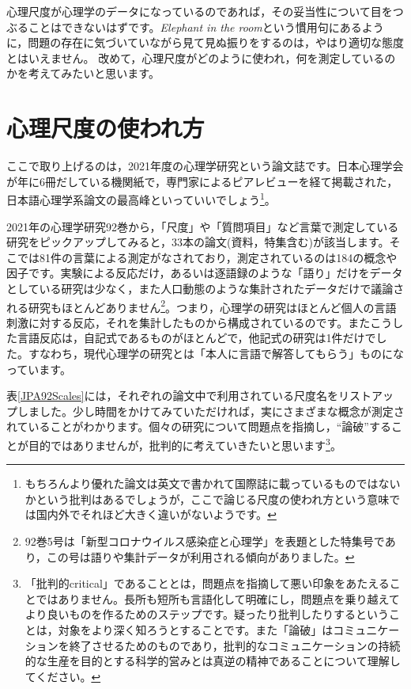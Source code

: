 \documentclass{ltjsbook}
\begin{document}
心理尺度が心理学のデータになっているのであれば，その妥当性について目をつぶることはできないはずです。\textit{Elephant in the room}という慣用句にあるように，問題の存在に気づいていながら見て見ぬ振りをするのは，やはり適切な態度とはいえません。
改めて，心理尺度がどのように使われ，何を測定しているのかを考えてみたいと思います。

\section{心理尺度の使われ方}
ここで取り上げるのは，2021年度の心理学研究という論文誌です。日本心理学会が年に6冊だしている機関紙で，専門家によるピアレビューを経て掲載された，日本語心理学系論文の最高峰といっていいでしょう\footnote{もちろんより優れた論文は英文で書かれて国際誌に載っているものではないかという批判はあるでしょうが，ここで論じる尺度の使われ方という意味では国内外でそれほど大きく違いがないようです。}。

2021年の心理学研究92巻から，「尺度」や「質問項目」など言葉で測定している研究をピックアップしてみると，33本の論文(資料，特集含む)が該当します。そこでは81件の言葉による測定がなされており，測定されているのは184の概念や因子です。実験による反応だけ，あるいは逐語録のような「語り」だけをデータとしている研究は少なく，また人口動態のような集計されたデータだけで議論される研究もほとんどありません\footnote{92巻5号は「新型コロナウイルス感染症と心理学」を表題とした特集号であり，この号は語りや集計データが利用される傾向がありました。}。つまり，心理学の研究はほとんど個人の言語刺激に対する反応，それを集計したものから構成されているのです。またこうした言語反応は，自記式であるものがほとんどで，他記式の研究は1件\citet{Nagatani202292}だけでした。すなわち，現代心理学の研究とは「本人に言語で解答してもらう」ものになっています。

表\ref{JPA92Scales}には，それぞれの論文中で利用されている尺度名をリストアップしました。少し時間をかけてみていただければ，実にさまざまな概念が測定されていることがわかります。個々の研究について問題点を指摘し，``論破''することが目的ではありませんが，批判的に考えていきたいと思います\footnote{「批判的critical」であることとは，問題点を指摘して悪い印象をあたえることではありません。長所も短所も言語化して明確にし，問題点を乗り越えてより良いものを作るためのステップです。疑ったり批判したりするということは，対象をより深く知ろうとすることです。また「論破」はコミュニケーションを終了させるためのものであり，批判的なコミュニケーションの持続的な生産を目的とする科学的営みとは真逆の精神であることについて理解してください。}。
\end{document}
